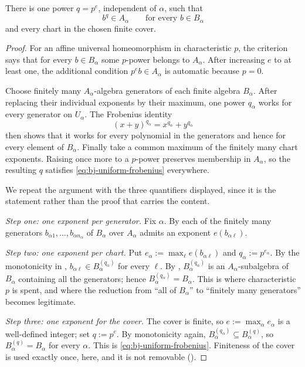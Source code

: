 \begin{lemma}\label{lem:bj-uniform-frobenius}
There is one power $q=p^e$, independent of $\alpha$, such that
\[
                         b^q\in A_\alpha
            \qquad\text{for every }b\in B_\alpha
\tag{43.11}\label{eq:bj-uniform-frobenius}
\]
and every chart in the chosen finite cover.
\end{lemma}

\begin{proof}
For an affine universal homeomorphism in characteristic $p$, the criterion
\cite[\href{https://stacks.math.columbia.edu/tag/0CNF}{Tag 0CNF}]
{stacks-project} says that for every $b\in B_\alpha$ some $p$-power
belongs to $A_\alpha$.
After increasing $e$ to at least one, the additional condition
$p^e b\in A_\alpha$ is automatic because $p=0$.

Choose finitely many $A_\alpha$-algebra generators of each finite algebra
$B_\alpha$.
After replacing their individual exponents by their maximum, one power
$q_\alpha$ works for every generator on $U_\alpha$.
The Frobenius identity
\[
                    (x+y)^{q_\alpha}=x^{q_\alpha}+y^{q_\alpha}
\]
then shows that it works for every polynomial in the generators and hence
for every element of $B_\alpha$.
Finally take a common maximum of the finitely many chart exponents.
Raising once more to a $p$-power preserves membership in $A_\alpha$, so
the resulting $q$ satisfies \eqref{eq:bj-uniform-frobenius} everywhere.

We repeat the argument with the three quantifiers displayed, since it is the
statement rather than the proof that carries the content.

\emph{Step one: one exponent per generator.}  Fix $\alpha$.  By
 each of the finitely many generators
$b_{\alpha1},\ldots,b_{\alpha n_\alpha}$ of $B_\alpha$ over
$A_\alpha$ admits an exponent $e(b_{\alpha\ell})$.

\emph{Step two: one exponent per chart.}  Put
$e_\alpha:=\max_\ell e(b_{\alpha\ell})$ and $q_\alpha:=p^{e_\alpha}$.  By
the monotonicity in ,
$b_{\alpha\ell}\in B_\alpha^{(q_\alpha)}$ for every $\ell$.  By
, $B_\alpha^{(q_\alpha)}$ is an
$A_\alpha$-subalgebra of $B_\alpha$ containing all the generators; hence
$B_\alpha^{(q_\alpha)}=B_\alpha$.  This is where characteristic $p$ is
spent, and where the reduction from ``all of $B_\alpha$'' to ``finitely
many generators'' becomes legitimate.

\emph{Step three: one exponent for the cover.}  The cover is finite, so
$e:=\max_\alpha e_\alpha$ is a well-defined integer; set $q:=p^e$.  By
monotonicity again, $B_\alpha^{(q_\alpha)}\subseteq B_\alpha^{(q)}$, so
$B_\alpha^{(q)}=B_\alpha$ for every $\alpha$.  This is
\eqref{eq:bj-uniform-frobenius}.  Finiteness of the cover is used exactly
once, here, and it is not removable
().
\end{proof}

